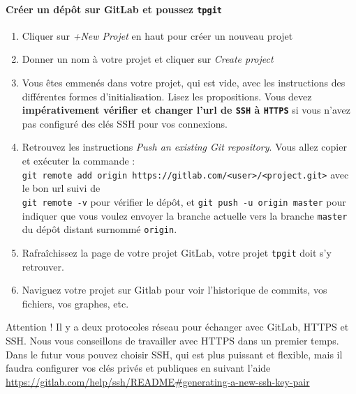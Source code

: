 \documentclass[final, a4paper, openbib, ]{article}
\begin{document}
\paragraph{Créer un dépôt sur GitLab et poussez \texttt{tpgit}}
\begin{enumerate}
\item Cliquer sur \textit{+New Projet} en haut pour créer un nouveau projet
\item Donner un nom à votre projet et cliquer sur \textit{Create project}
\item Vous êtes emmenés dans votre projet, qui est vide, avec les instructions des différentes formes d'initialisation.
Lisez les propositions.
Vous devez \textbf{impérativement vérifier et changer l'url de \texttt{SSH} à \texttt{HTTPS}} si vous n'avez pas configuré des clés SSH pour vos connexions.
\item Retrouvez les instructions \textit{Push an existing Git repository}. Vous allez copier et exécuter la commande :\\ \texttt{git remote add origin https://gitlab.com/<user>/<project.git>} avec le bon url suivi de\\ \texttt{git remote -v} pour vérifier le dépôt, et \texttt{git push -u origin master} pour indiquer que vous voulez envoyer la branche actuelle vers la branche \texttt{master} du dépôt distant surnommé \texttt{origin}.
\item Rafraîchissez la page de votre projet GitLab, votre projet \texttt{tpgit} doit s'y retrouver.
\item Naviguez votre projet sur Gitlab pour voir l'historique de commits, vos fichiers, vos graphes, etc.
\end{enumerate}	

\begin{alertinfo2}{Attention !}
Il y a deux protocoles réseau pour échanger avec GitLab, HTTPS et SSH. Nous vous conseillons de travailler avec HTTPS dans un premier temps.
Dans le futur vous pouvez choisir SSH, qui est plus puissant et flexible, mais il faudra configurer vos clés privés et publiques en suivant l'aide \url{https://gitlab.com/help/ssh/README\#generating-a-new-ssh-key-pair}
\end{alertinfo2}
\end{document}
